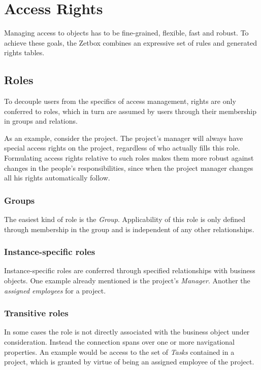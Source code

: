 \section{Access Rights}

Managing access to objects has to be fine-grained, flexible, fast and robust.
To achieve these goals, the Zetbox combines an expressive set of rules and
generated rights tables.

\subsection{Roles}

To decouple users from the specifics of access management, rights are only
conferred to roles, which in turn are assumed by users through their membership
in groups and relations. 

As an example, consider the project. The project's manager will always have
special access rights on the project, regardless of who actually fills this
role. Formulating access rights relative to such roles makes them more robust
against changes in the people's responsibilities, since when the project manager
changes all his rights automatically follow.

\subsubsection{Groups}

The easiest kind of role is the \emph{Group}. Applicability of this role is only
defined through membership in the group and is independent of any other
relationships.

\subsubsection{Instance-specific roles}

Instance-specific roles are conferred through specified relationships with
business objects. One example already mentioned is the project's \emph{Manager}.
Another the \emph{assigned employees} for a project.

\subsubsection{Transitive roles}

In some cases the role is not directly associated with the business object under
consideration. Instead the connection spans over one or more navigational
properties. An example would be access to the set of \emph{Tasks} contained in a
project, which is granted by virtue of being an assigned employee of the
project.

